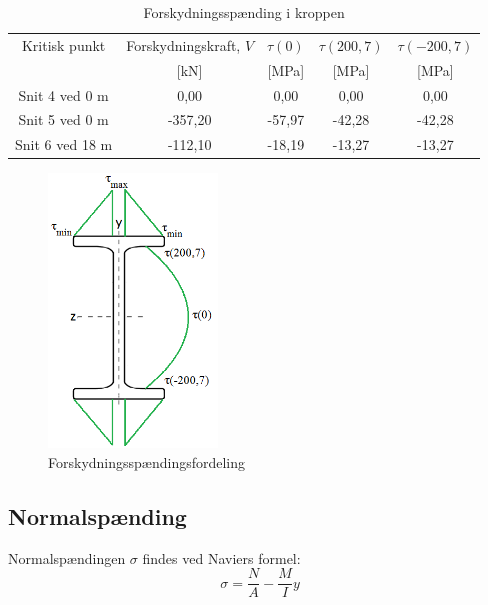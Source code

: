 \begin{table}
	\begin{center}
		\begin{tabular}{c c c c c }
			\hline
			Kritisk punkt   & Forskydningskraft, $V$ & $\tau(0)$ & $\tau(200,7)$ & $\tau(-200,7)$ \\ 
			& [kN] & [MPa] & [MPa] & [MPa] \\ \hline
			Snit 4 ved 0 m  & 0,00                       & 0,00       & 0,00          & 0,00                  \\ \hline
			Snit 5 ved 0 m  & -357,20                 & -57,97  & -42,28     & -42,28     \\ \hline
			Snit 6 ved 18 m & -112,10                 & -18,19  & -13,27     & -13,27       \\ \hline
		\end{tabular}
		\caption{Forskydningsspænding i kroppen}
		\label{tab:kroppen}
	\end{center}
\end{table}

\begin{figure}[H]
	\centering
	\includegraphics[width=0.4\textwidth]{billeder/forskydningsfordeling.png}
	\caption{Forskydningsspændingsfordeling}
	\label{fig:forskydfordeling}
\end{figure}

\subsection{Normalspænding}
Normalspændingen $\sigma$ findes ved Naviers formel:
\begin{equation}
\sigma = \frac{N}{A} - \frac{M}{I} y
\end{equation}

